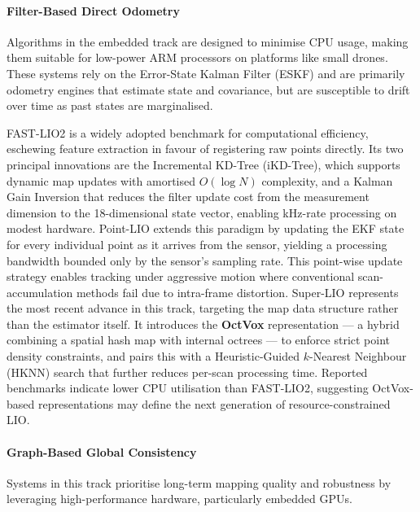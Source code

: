 \paragraph{Filter-Based Direct Odometry}
Algorithms in the embedded track are designed to minimise CPU usage, making them suitable for low-power ARM processors on platforms like small drones. These systems rely on the Error-State Kalman Filter (ESKF) and are primarily odometry engines that estimate state and covariance, but are susceptible to drift over time as past states are marginalised.

FAST-LIO2 \cite{xuFASTLIO2FastDirect2022} is a widely adopted benchmark for computational efficiency, eschewing feature extraction in favour of registering raw points directly. Its two principal innovations are the Incremental KD-Tree (iKD-Tree), which supports dynamic map updates with amortised $O(\log N)$ complexity, and a Kalman Gain Inversion that reduces the filter update cost from the measurement dimension to the 18-dimensional state vector, enabling kHz-rate processing on modest hardware. Point-LIO \cite{hePointLIORobustHighBandwidth2023} extends this paradigm by updating the EKF state for every individual point as it arrives from the sensor, yielding a processing bandwidth bounded only by the sensor's sampling rate. This point-wise update strategy enables tracking under aggressive motion where conventional scan-accumulation methods fail due to intra-frame distortion. Super-LIO \cite{wangSuperLIORobustEfficient2025} represents the most recent advance in this track, targeting the map data structure rather than the estimator itself. It introduces the \textbf{OctVox} representation — a hybrid combining a spatial hash map with internal octrees — to enforce strict point density constraints, and pairs this with a Heuristic-Guided $k$-Nearest Neighbour (HKNN) search that further reduces per-scan processing time. Reported benchmarks indicate lower CPU utilisation than FAST-LIO2, suggesting OctVox-based representations may define the next generation of resource-constrained LIO.

\paragraph{Graph-Based Global Consistency}
Systems in this track prioritise long-term mapping quality and robustness by leveraging high-performance hardware, particularly embedded GPUs.

